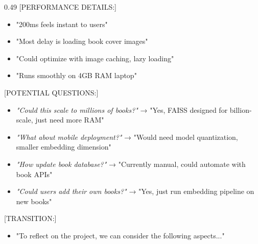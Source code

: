 {\begin{columns}[T]
    \begin{column}{0.49\textwidth}
      [PERFORMANCE DETAILS:]
      \begin{itemize}
        \item "200ms feels instant to users"
        \item "Most delay is loading book cover images"
        \item "Could optimize with image caching, lazy loading"
        \item "Runs smoothly on 4GB RAM laptop"
      \end{itemize}
      
      \vspace{0.2cm}
      [POTENTIAL QUESTIONS:]
      \begin{itemize}
        \item \textit{"Could this scale to millions of books?"} → "Yes, FAISS designed for billion-scale, just need more RAM"
        \item \textit{"What about mobile deployment?"} → "Would need model quantization, smaller embedding dimension"
        \item \textit{"How update book database?"} → "Currently manual, could automate with book APIs"
        \item \textit{"Could users add their own books?"} → "Yes, just run embedding pipeline on new books"
      \end{itemize}
      
      \vspace{0.2cm}
      [TRANSITION:]
      \begin{itemize}
        \item "To reflect on the project, we can consider the following aspects..."
      \end{itemize}
    \end{column}
  \end{columns}
}
